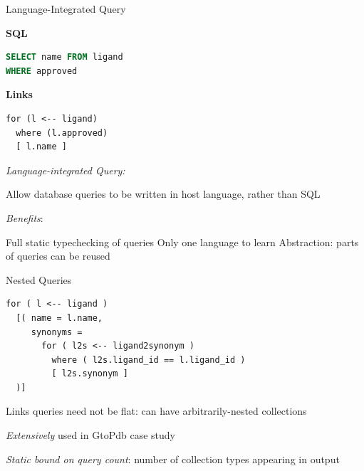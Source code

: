 \documentclass[11.5pt, aspectratio=169]{beamer}
\begin{document}
\begin{frame}[fragile]{Language-Integrated Query}

  \begin{minipage}[t]{0.45\textwidth}
    {\large \textbf{SQL}}
    \begin{lstlisting}[language=sql]
SELECT name FROM ligand
WHERE approved
    \end{lstlisting}
  \end{minipage}
  \hfill
  \begin{minipage}[t]{0.45\textwidth}
    {\large \textbf{Links}}
    \begin{lstlisting}[language=Links]
for (l <-- ligand)
  where (l.approved)
  [ l.name ]
    \end{lstlisting}
  \end{minipage}

  \begin{fullpageitemize}
  \item {\Large \emph{Language-integrated Query:}}
    \begin{itemize}
      \itemR Allow database queries to be written in host language, rather than SQL
    \end{itemize}
    \vspace{1em}
    \item { \Large \emph{Benefits}:}
    \begin{itemize}
      \itemR Full static typechecking of queries
      \itemR Only one language to learn
      \itemR Abstraction: parts of queries can be reused
    \end{itemize}
  \end{fullpageitemize}
\end{frame}

\begin{frame}[fragile]{Nested Queries}

  \begin{lstlisting}[language=Links]
for ( l <-- ligand )
  [( name = l.name,
     synonyms =
       for ( l2s <-- ligand2synonym )
         where ( l2s.ligand_id == l.ligand_id )
         [ l2s.synonym ]
  )]
  \end{lstlisting}

  \begin{fullpageitemize}
    \item Links queries need not be flat: can have arbitrarily-nested collections
    \item \emph{Extensively} used in GtoPdb case study
    \item \emph{Static bound on query count}: number of collection types appearing in output
  \end{fullpageitemize}

\end{frame}
\end{document}
